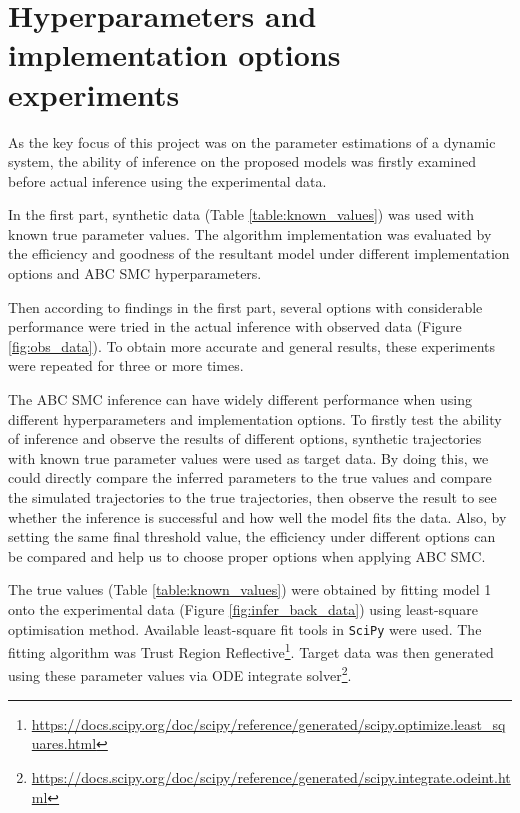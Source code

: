 




\section{Hyperparameters and implementation options experiments}

As the key focus of this project was on the parameter estimations of a dynamic system, the ability of inference on the proposed models was firstly examined before actual inference using the experimental data.

In the first part, synthetic data (Table \ref{table:known_values}) was used with known true parameter values. The algorithm implementation was evaluated by the efficiency and goodness of the resultant model under different implementation options and ABC SMC hyperparameters.

Then according to findings in the first part, several options with considerable performance were tried in the actual inference with observed data (Figure \ref{fig:obs_data}). To obtain more accurate and general results, these experiments were repeated for three or more times.





    The ABC SMC inference can have widely different performance when using different hyperparameters and implementation options. To firstly test the ability of inference and observe the results of different options, synthetic trajectories with known true parameter values were used as target data. By doing this, we could directly compare the inferred parameters to the true values and compare the simulated trajectories to the true trajectories, then observe the result to see whether the inference is successful and how well the model fits the data. Also, by setting the same final threshold value, the efficiency under different options can be compared and help us to choose proper options when applying ABC SMC. 

    The true values (Table \ref{table:known_values}) were obtained by fitting model 1 onto the experimental data (Figure \ref{fig:infer_back_data}) using least-square optimisation method. Available least-square fit tools in \verb|SciPy| were used. The fitting algorithm was Trust Region Reflective\footnote{\url{https://docs.scipy.org/doc/scipy/reference/generated/scipy.optimize.least_squares.html}}. Target data was then generated using these parameter values via ODE integrate solver\footnote{\url{https://docs.scipy.org/doc/scipy/reference/generated/scipy.integrate.odeint.html}}.


